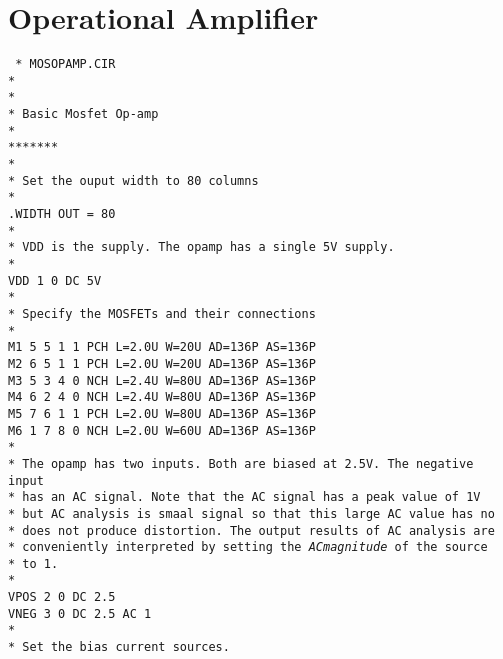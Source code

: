 \section{Operational Amplifier\label{ex:opamp}}

{\tt
* MOSOPAMP.CIR\\
*\\
*\\
* Basic Mosfet Op-amp\\
*\\
*******\\
*\\
* Set the ouput width to 80 columns\\
*\\
.WIDTH OUT = 80\\
*\\
* VDD is the supply.  The opamp has a single 5V supply.\\
*\\
VDD 1 0 DC 5V\\
*\\
* Specify the MOSFETs and their connections\\
*\\
M1 5 5 1 1 PCH L=2.0U W=20U AD=136P AS=136P\\
M2 6 5 1 1 PCH L=2.0U W=20U AD=136P AS=136P\\
M3 5 3 4 0 NCH L=2.4U W=80U AD=136P AS=136P\\
M4 6 2 4 0 NCH L=2.4U W=80U AD=136P AS=136P\\
M5 7 6 1 1 PCH L=2.0U W=80U AD=136P AS=136P\\
M6 1 7 8 0 NCH L=2.0U W=60U AD=136P AS=136P\\
*\\
* The opamp has two inputs. Both are biased at 2.5V.  The negative input\\
* has an AC signal.  Note that the AC signal has a peak value of 1V\\
* but AC analysis is smaal signal so that this large AC value has no\\
* does not produce distortion.  The output results of AC analysis are\\
* conveniently interpreted by setting the {\it ACmagnitude} of the source\\
* to 1.\\
*\\
VPOS 2 0 DC 2.5\\
VNEG 3 0 DC 2.5 AC 1\\
*\\
* Set the bias current sources.\\
}
